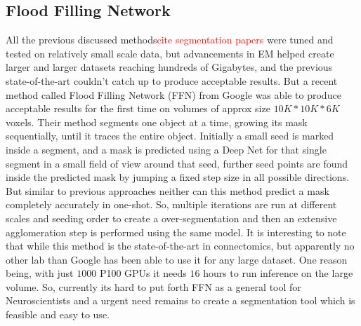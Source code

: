 \subsection{Flood Filling Network}
All the previous discussed methods\textcolor{red}{cite segmentation papers}  were tuned and tested on relatively small scale data, but advancements in EM helped create larger and larger datasets reaching hundreds of Gigabytes, and the previous state-of-the-art couldn't catch up to produce acceptable results. But a recent method called Flood Filling Network (FFN) \cite{Januszewski2018FFN} from Google was able to produce acceptable results for the first time on volumes of approx size $10K*10K*6K$ voxels.
Their method segments one object at a time, growing its mask sequentially, until it traces the entire object. Initially a small seed is marked inside a segment, and a mask is predicted using a Deep Net for that single segment in a small field of view around that seed, further seed points are found inside the predicted mask by jumping a fixed step size in all possible directions.
But similar to previous approaches neither can this method predict a mask completely accurately in one-shot. So, multiple iterations are run at different scales and seeding order to create a over-segmentation and then an extensive agglomeration step is performed using the same model.
It is interesting to note that while this method is the state-of-the-art in connectomics, but apparently no other lab than Google has been able to use it for any large dataset. One reason being, with just $1000$ P100 GPUs it needs $16$ hours to run inference on the large volume\cite{Januszewski2017FFN}. So, currently its hard to put forth FFN as a general tool for Neuroscientists and a urgent need remains to create a segmentation tool which is feasible and easy to use.


